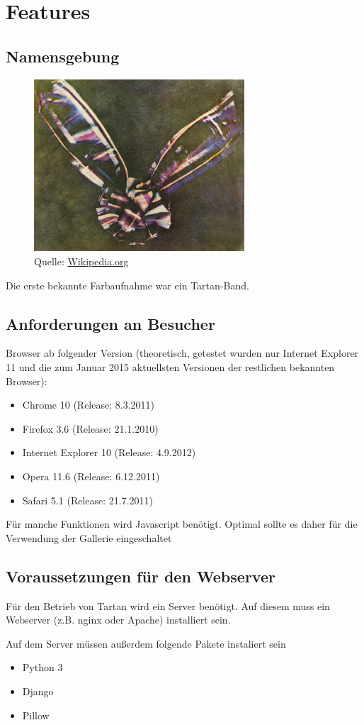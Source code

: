 \chapter{Features}

\section{Namensgebung}
\begin{figure}[h]
  \centering
  \includegraphics[width=0.7\textwidth]{images/tartan_band.jpg}
  \caption{Quelle: \url{Wikipedia.org}}
\end{figure}
Die erste bekannte Farbaufnahme war ein Tartan-Band.

\section{Anforderungen an Besucher}\label{besAnforderungen}
Browser ab folgender Version (theoretisch, getestet wurden nur Internet Explorer 11 und die zum Januar 2015 aktuellsten Versionen der restlichen bekannten Browser):
\begin{itemize}
	\item Chrome 10 (Release: 8.3.2011)
	\item Firefox 3.6 (Release: 21.1.2010)
	\item Internet Explorer 10 (Release: 4.9.2012)
	\item Opera 11.6 (Release: 6.12.2011)
	\item Safari 5.1 (Release: 21.7.2011)
\end{itemize}

Für manche Funktionen wird Javascript benötigt. Optimal sollte es daher für die Verwendung der Gallerie eingeschaltet

\section{Voraussetzungen für den Webserver}
Für den Betrieb von Tartan wird ein Server benötigt. Auf diesem muss ein Webserver (z.B. nginx oder Apache) installiert sein.

Auf dem Server müssen außerdem folgende Pakete instaliert sein
\begin{itemize}
	\item Python 3
	\item Django
	\item Pillow
\end{itemize}